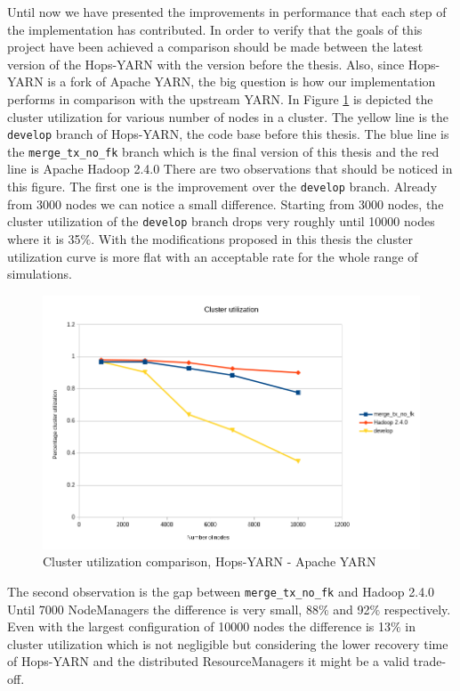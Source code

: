 Until now we have presented the improvements in performance that each
step of the implementation has contributed. In order to verify that
the goals of this project have been achieved a comparison should be
made between the latest version of the Hops-YARN with the version
before the thesis. Also, since Hops-YARN is a fork of Apache YARN, the
big question is how our implementation performs in comparison with the
upstream YARN. In Figure \ref{fig:ev_cluster_util_final} is depicted
the cluster utilization for various number of nodes in a cluster. 
The yellow line is the \texttt{develop} branch of Hops-YARN, the code
base before this thesis. The blue line is the
\texttt{merge\_tx\_no\_fk} branch which is the final version of this
thesis and the red line is Apache Hadoop 2.4.0 There are two observations
that should be noticed in this figure. The first one is the
improvement over the \texttt{develop} branch. Already from 3000 nodes
we can notice a small difference. Starting from 3000 nodes,
the cluster utilization of the \texttt{develop} branch drops very
roughly until 10000 nodes where it is 35$\%$. With the modifications
proposed in this thesis the cluster utilization curve is more flat
with an acceptable rate for the whole range of simulations.

\begin{figure}
\centering
\includegraphics[scale=0.6]{resources/images/Evaluation/cluster_usage_final.png}
\caption{Cluster utilization comparison, Hops-YARN - Apache YARN}
\label{fig:ev_cluster_util_final}
\end{figure}

The second observation is the gap between \texttt{merge\_tx\_no\_fk} and
Hadoop 2.4.0 Until 7000 NodeManagers the difference is very small,
88$\%$ and 92$\%$ respectively. Even with the largest configuration
of 10000 nodes the difference is 13$\%$ in cluster utilization which
is not negligible but considering the lower recovery time of Hops-YARN
and the distributed ResourceManagers it might be a valid trade-off.


